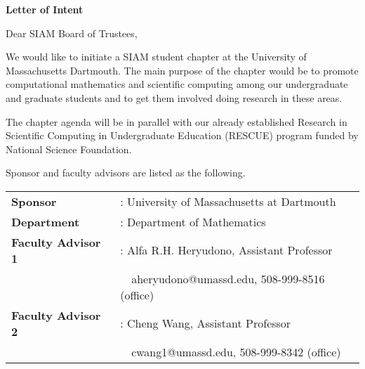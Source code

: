 \documentclass[letterpaper,12pt]{letter}
\begin{document}
    \begin{letter}{\textbf{Letter of Intent}}

    \opening{Dear SIAM Board of Trustees,}

    We would like to initiate a SIAM student chapter at the University of Massachusetts Dartmouth. The main purpose of the chapter would be to promote computational mathematics and scientific computing among our undergraduate and graduate students and to get them involved doing research in these areas.

    The chapter agenda will be in parallel with our already established Research in Scientific Computing in Undergraduate Education (RESCUE) program funded by National Science Foundation.

    Sponsor and faculty advisors are listed as the following.

    \begin{tabular}{ll}
    \textbf{Sponsor} &: University of Massachusetts at Dartmouth \\
        \textbf{Department} &: Department of Mathematics \\
        \textbf{Faculty Advisor 1} &: Alfa R.H. Heryudono, Assistant Professor \\
                                        &\ \ aheryudono@umassd.edu, 508-999-8516 (office) \\
                                        \textbf{Faculty Advisor 2} &: Cheng Wang, Assistant Professor \\
                                                                        &\ \ cwang1@umassd.edu, 508-999-8342 (office) \\                                     
                                                                        \end{tabular}


\end{letter}
\end{document}
